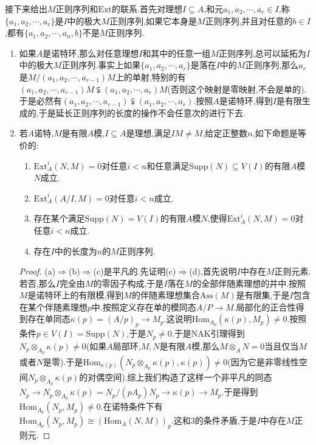 接下来给出$M$正则序列和$\mathrm{Ext}$的联系.首先对理想$I\subseteq A$,和元$a_1,a_2,\cdots,a_r\in I$,称$\{a_1,a_2,\cdots,a_r\}$是$I$中的极大$M$正则序列,如果它本身是$M$正则序列,并且对任意的$b\in I$,都有$\{a_1,a_2,\cdots,a_n,b\}$不是$M$正则序列.
\begin{enumerate}
	\item 如果$A$是诺特环,那么对任意理想$I$和其中的任意一组$M$正则序列,总可以延拓为$I$中的极大$M$正则序列.事实上如果$\{a_1,a_2,\cdots,a_r\}$是落在$I$中的$M$正则序列,那么$a_r$是$M/(a_1,a_2,\cdots,a_{r-1})M$上的单射,特别的有$(a_1,a_2,\cdots,a_{r-1})M\subsetneqq(a_1,a_2,\cdots,a_r)M$(否则这个映射是零映射,不会是单的).于是必然有$(a_1,a_2,\cdots,a_{r-1})\subsetneqq(a_1,a_2,\cdots,a_r)$.按照$A$是诺特环,得到$I$是有限生成的,于是延长正则序列的长度的操作不会任意次的进行下去.
	\item 若$A$诺特,$M$是有限$A$模,$I\subseteq A$是理想,满足$IM\not=M$,给定正整数$n$,如下命题是等价的:
	\begin{enumerate}
		\item $\mathrm{Ext}_A^i(N,M)=0$对任意$i<n$和任意满足$\mathrm{Supp}(N)\subseteq V(I)$的有限$A$模$N$成立.
		\item $\mathrm{Ext}_A^i(A/I,M)=0$对任意$i<n$成立.
		\item 存在某个满足$\mathrm{Supp}(N)=V(I)$的有限$A$模$N$,使得$\mathrm{Ext}_A^i(N,M)=0$对任意$i<n$成立.
		\item 存在$I$中的长度为$n$的$M$正则序列.
	\end{enumerate}
	\begin{proof}
		
		(a)$\Rightarrow$(b)$\Rightarrow$(c)是平凡的.先证明(c)$\Rightarrow$(d),首先说明$I$中存在$M$正则元素.若否,那么$I$完全由$M$的零因子构成,于是$I$落在$M$的全部伴随素理想的并中.按照$M$是诺特环上的有限模,得到$M$的伴随素理想集合$\mathrm{Ass}(M)$是有限集,于是$I$包含在某个伴随素理想$p$中.按照定义存在单的模同态$A/P\to M$.局部化的正合性得到存在单同态$\kappa(p)=(A/p)_p\to M_p$.这说明$\mathrm{Hom}_{A_p}(\kappa(p),M_p)\not=0$.按照条件$p\in V(I)=\mathrm{Supp}(N)$,于是$N_p\not=0$.于是NAK引理得到$N_p\otimes_{A_p}\kappa(p)\not=0$(如果$A$局部环,$M,N$是有限$A$模,那么$M\otimes_AN=0$当且仅当$M$或者$N$是零).于是$\mathrm{Hom}_{\kappa(p)}(N_p\otimes_{A_p}\kappa(p),\kappa(p))\not=0$(因为它是非零线性空间$N_p\otimes_{A_p}\kappa(p)$的对偶空间).综上我们构造了这样一个非平凡的同态$N_p\to N_p\otimes_{A_p}\kappa(p)=N_p/(pA_p)N_p\to\kappa(p)\to M_p$.于是得到$\mathrm{Hom}_{A_p}(N_p,M_p)\not=0$.在诺特条件下有$\mathrm{Hom}_{A_p}(N_p,M_p)\cong(\mathrm{Hom}_A(N,M))_p$.这和3的条件矛盾,于是$I$中存在$M$正则元.
		

\end{proof}
\end{enumerate}

